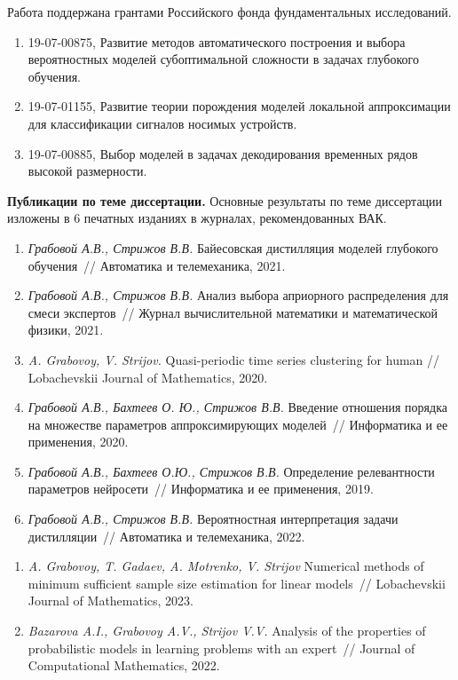 Работа поддержана грантами Российского фонда фундаментальных исследований.

\begin{enumerate}
    \item 19-07-00875, Развитие методов автоматического построения и выбора вероятностных моделей субоптимальной сложности в задачах глубокого обучения.
    \item 19-07-01155, Развитие теории порождения моделей локальной аппроксимации для классификации сигналов носимых устройств.
    \item 19-07-00885, Выбор моделей в задачах декодирования временных рядов высокой размерности.
\end{enumerate}

\vspace{0.5cm}
\textbf{Публикации по теме диссертации.} Основные результаты по теме диссертации изложены в 6 печатных изданиях в журналах, рекомендованных ВАК.
\begin{enumerate}
    \item \textit{Грабовой А.В., Стрижов В.В.} Байесовская дистилляция моделей глубокого обучения~// Автоматика и телемеханика, 2021.
    \item \textit{Грабовой А.В., Стрижов В.В.} Анализ выбора априорного распределения для смеси экспертов~// Журнал вычислительной математики и математической физики, 2021.
    \item \textit{A. Grabovoy, V. Strijov.} Quasi-periodic time series clustering for human // Lobachevskii Journal of Mathematics, 2020.
    \item \textit{Грабовой А.В., Бахтеев О. Ю., Стрижов В.В.} Введение отношения порядка на множестве параметров аппроксимирующих моделей~// Информатика и ее применения, 2020.
    \item \textit{Грабовой А.В., Бахтеев О.Ю., Стрижов В.В.} Определение релевантности параметров нейросети~// Информатика и ее применения, 2019.
    \item \textit{Грабовой А.В., Стрижов В.В.} Вероятностная интерпретация задачи дистилляции~// Автоматика и телемеханика, 2022.
\end{enumerate}
\begin{enumerate}
    \item \textit{A. Grabovoy, T. Gadaev, A. Motrenko, V. Strijov} Numerical methods of minimum sufficient sample size estimation for linear models~// Lobachevskii Journal of Mathematics, 2023.
    \item \textit{Bazarova A.I., Grabovoy A.V., Strijov V.V.} Analysis of the properties of probabilistic models in learning problems with an expert~// Journal of Computational Mathematics, 2022.
\end{enumerate}

